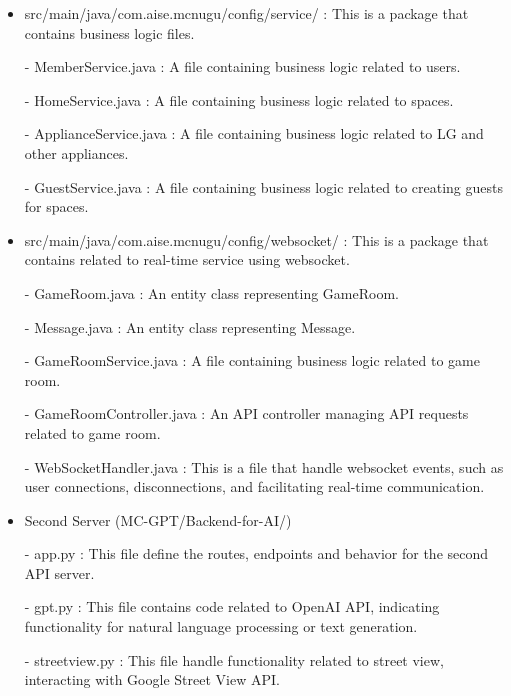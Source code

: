 \documentclass[conference]{IEEEtran}
\begin{document}
\begin{itemize}
                \item src/main/java/com.aise.mcnugu/config/service/ : This is a package that contains business logic files.
                    \item[-] MemberService.java : A file containing business logic related to users.
                    \item[-] HomeService.java : A file containing business logic related to spaces.
                    \item[-] ApplianceService.java : A file containing business logic related to LG and other appliances.
                    \item[-] GuestService.java : A file containing business logic related to creating guests for spaces.
                \vspace{3mm}

                \item  src/main/java/com.aise.mcnugu/config/websocket/ : This is a package that contains related to real-time service using websocket.
                    \item[-] GameRoom.java : An entity class representing GameRoom.
                    \item[-] Message.java : An entity class representing Message.
                    \item[-] GameRoomService.java : A file containing business logic related to game room.
                    \item[-] GameRoomController.java : An API controller managing API requests related to game room.
                    \item[-] WebSocketHandler.java : This is a file that handle websocket events, such as user connections, disconnections, and facilitating real-time communication.
                \vspace{3mm}

                \item Second Server (MC-GPT/Backend-for-AI/)
                    \item[-] app.py : This file define the routes, endpoints and behavior for the second API server.
                    \item[-] gpt.py : This file contains code related to OpenAI API, indicating functionality for natural language processing or text generation.
                    \item[-] streetview.py : This file handle functionality related to street view, interacting with Google Street View API.

                
            \end{itemize}
        
\end{document}
